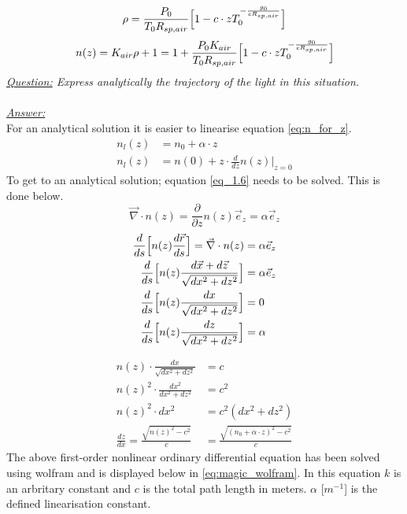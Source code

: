 \documentclass{article}
\begin{document}
\begin{equation}
	\rho = \frac{P_0}{T_0 R_{sp,air}} \Bigl[1-c\cdot z T_0^{-\frac{g_0}{c R_{sp,air}}}\Bigr]
	\label{eq:rho_for_z}
\end{equation}
\begin{equation}
	n(z) = K_{air}\rho + 1 = 1 + \frac{P_0 K_{air}}{T_0 R_{sp,air}} \Bigl[1-c\cdot z T_0^{-\frac{g_0}{c R_{sp,air}}}\Bigr]
	\label{eq:n_for_z}
\end{equation}
\textit{\underline{Question:} Express analytically the trajectory of the light in this situation.}\\
\\
\textit{\underline{Answer:}} \\
For an analytical solution it is easier to linearise equation \ref{eq:n_for_z}.
\begin{align*}
	n_l(z) &= n_0 + \alpha \cdot z\\
	n_l(z) &= n(0) +z \cdot \frac{d}{dz}n(z)\rvert_{z=0}
\end{align*}
To get to an analytical solution; equation \ref{eq_1.6} needs to be solved. This is done below.
\begin{equation*}
	\vec{\nabla} \cdot n(z) = \frac{\partial}{\partial z}n(z) \vec{e}_z = \alpha \vec{e}_z
\end{equation*}
\begin{align*}
	\frac{d}{ds} \Bigl[n(z)\frac{d\vec{r}}{ds}\Bigr] = \vec{\nabla}\cdot n(z) &= \alpha \vec{e}_z\\
	\frac{d}{ds} \Bigl[n(z)\frac{d\vec{x}+d\vec{z}}{\sqrt{dx^2 + dz^2}}\Bigr] &= \alpha \vec{e}_z\\
	\frac{d}{ds} \Bigl[n(z)\frac{dx}{\sqrt{dx^2 + dz^2}}\Bigr] &= 0\\
	\frac{d}{ds} \Bigl[n(z)\frac{dz}{\sqrt{dx^2 + dz^2}}\Bigr] &= \alpha\\
\end{align*}

\begin{align*}
	n(z)\cdot \frac{dx}{\sqrt{dx^2 + dz^2}} &= c\\
	n(z)^2 \cdot \frac{dx^2}{dx^2 + dz^2} &= c^2\\
	n(z)^2 \cdot dx^2 &= c^2(dx^2 + dz^2)\\
	\frac{dz}{dx} = \frac{\sqrt{n(z)^2 -c^2}}{c} &= \frac{\sqrt{(n_0+\alpha\cdot z)^2 -c^2}}{c}
\end{align*}
The above first-order nonlinear ordinary differential equation has been solved using wolfram and is displayed below in \ref{eq:magic_wolfram}. In this equation $k$ is an arbritary constant and $c$ is the total path length in meters. $\alpha$ [$m^{-1}$] is the defined linearisation constant.
\end{document}

